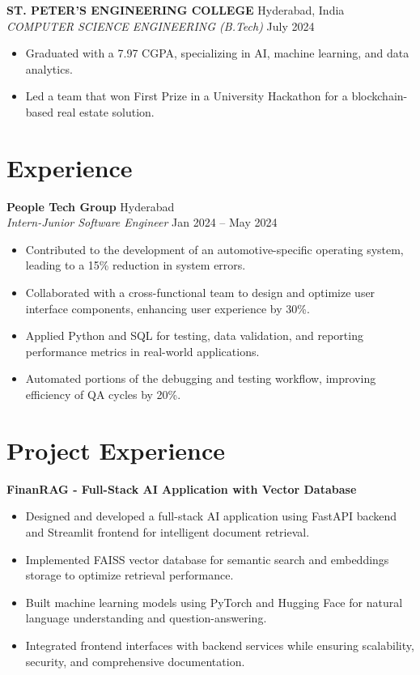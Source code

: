 \documentclass[a4paper,10pt]{article}
\begin{document}
\vspace{5pt}

\noindent \textbf{ ST. PETER'S ENGINEERING COLLEGE } \hfill Hyderabad, India \\
\textit{ COMPUTER SCIENCE ENGINEERING (B.Tech) } \hfill July 2024
\begin{itemize}
    \item Graduated with a 7.97 CGPA, specializing in AI, machine learning, and data analytics.
    \item Led a team that won First Prize in a University Hackathon for a blockchain-based real estate solution.
\end{itemize}

\section{Experience}
\noindent \textbf{ People Tech Group } \hfill Hyderabad \\
\textit{ Intern-Junior Software Engineer } \hfill Jan 2024 -- May 2024
\begin{itemize}
    \item Contributed to the development of an automotive-specific operating system, leading to a 15\% reduction in system errors.
    \item Collaborated with a cross-functional team to design and optimize user interface components, enhancing user experience by 30\%.
    \item Applied Python and SQL for testing, data validation, and reporting performance metrics in real-world applications.
    \item Automated portions of the debugging and testing workflow, improving efficiency of QA cycles by 20\%.
\end{itemize}

\section{Project Experience}

\noindent \textbf{ FinanRAG - Full-Stack AI Application with Vector Database }
\begin{itemize}
    \item Designed and developed a full-stack AI application using FastAPI backend and Streamlit frontend for intelligent document retrieval.
    \item Implemented FAISS vector database for semantic search and embeddings storage to optimize retrieval performance.
    \item Built machine learning models using PyTorch and Hugging Face for natural language understanding and question-answering.
    \item Integrated frontend interfaces with backend services while ensuring scalability, security, and comprehensive documentation.
\end{itemize}
\end{document}
